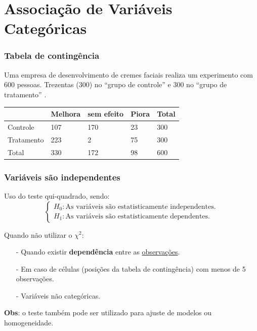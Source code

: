 \documentclass[graphics,14pt]{beamer}
\begin{document}
\section{Associação de Variáveis Categóricas}
\begin{frame}[t,fragile=singleslide]
\frametitle{Tabela de contingência}

	Uma empresa de desenvolvimento de cremes faciais realiza um experimento com 600 pessoas. Trezentas (300) no ``grupo de controle'' e 300 no ``grupo de tratamento'' \citep{Kahan2017}.	
	
	\begin{table}[]
		\begin{tabular}{C{6cm}|C{4cm}|C{4cm}|C{4cm}|C{4cm}}
			& Melhora & sem efeito & Piora & Total \\ \midrule
			Controle   & 107     & 170        & 23    & 300   \\ \midrule
			Tratamento & 223     & 2          & 75    & 300   \\ \midrule
			Total      & 330     & 172        & 98    & 600     
		\end{tabular}
	\end{table}



\end{frame}
\begin{frame}[t,fragile=singleslide]
\frametitle{Variáveis são independentes}
\vspace{1cm}
Uso do teste qui-quadrado, sendo: \\

\begin{equation*}
\left\{ \begin{array}{cl}
H_0 : \text{As variáveis são estatisticamente independentes}.\\
H_1 : \text{As variáveis são estatisticamente dependentes}.
\end{array}\right.
\end{equation*}

\vspace{1cm}
Quando não utilizar o $\chi^2$:
\begin{itemize}
	\item[-] Quando existir \textbf{dependência} entre as \ul{observações}.
	\item[-] Em caso de células (posições da tabela de contingência) com menos de 5 observações.
	\item[-] Variáveis não categóricas.
\end{itemize}
\vspace{1cm}
\textbf{Obs}: o teste também pode ser utilizado para ajuste de modelos ou homogeneidade.

\end{frame}
\end{document}
